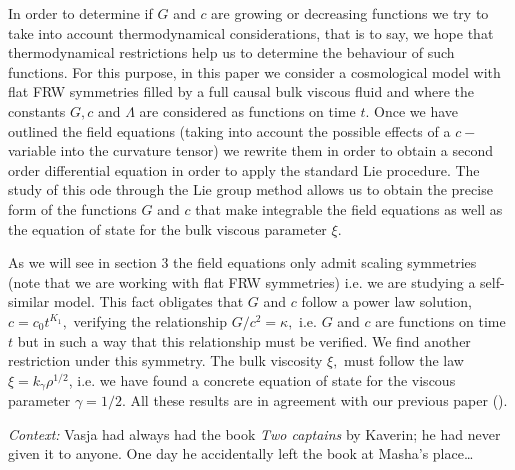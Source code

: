 \documentclass{revtex4}
\begin{document}
In order to determine if $G$ and $c$ are growing or decreasing functions we
try to take into account thermodynamical considerations, that is to say, we
hope that thermodynamical restrictions help us to determine the behaviour of
such functions. For this purpose, in this paper we consider a cosmological
model with flat FRW symmetries filled by a full causal bulk viscous fluid
and where the constants $G,c$ and $\Lambda $ are considered as functions on
time $t.$ Once we have outlined the field equations (taking into account the
possible effects of a $c-$variable into the curvature tensor) we rewrite
them in order to obtain a second order differential equation in order to
apply the standard Lie procedure. The study of this ode through the Lie
group method allows us to obtain the precise form of the functions $G$ and $%
c $ that make integrable the field equations as well as the equation of
state for the bulk viscous parameter $\xi .$

As we will see in section 3 the field equations only admit scaling
symmetries (note that we are working with flat FRW symmetries) i.e. we are
studying a self-similar model. This fact obligates that $G$ and $c$ follow a
power law solution, $c=c_{0}t^{K_{1}},$ verifying the relationship $%
G/c^{2}=\kappa ,$ i.e. $G$ and $c$ are functions on time $t$ but in such a
way that this relationship must be verified. We find another restriction
under this symmetry. The bulk viscosity $\xi ,$ must follow the law $\xi
=k_{\gamma }\rho ^{1/2}$, i.e. we have found a concrete equation of state
for the viscous parameter $\gamma =1/2.$ All these results are in agreement
with our previous paper (\cite{Tony2}).



 \ea\label{ex:bondarenko:7}\textit{Context:} Vasja had always had the book \textit{Two captains} by Kaverin; he had never given it to anyone. One day he accidentally left the book at Masha’s place\dots
{}
\z
\z
\end{document}
